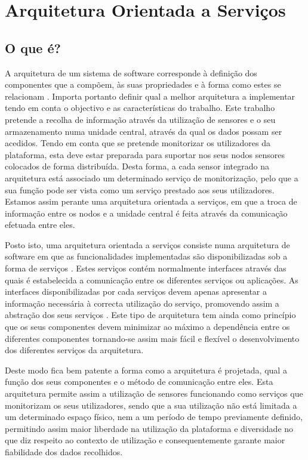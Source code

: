 \chapter{Arquitetura Orientada a Serviços}

\section{O que é?}
A arquitetura de um sistema de software corresponde à definição dos componentes que a compõem, às suas propriedades e à forma como estes se relacionam \cite{bosch2004software}. Importa portanto definir qual a melhor arquitetura a implementar tendo em conta o objectivo e as características do trabalho. Este trabalho pretende a recolha de informação através da utilização de sensores e o seu armazenamento numa unidade central, através da qual os dados possam ser acedidos. Tendo em conta que se pretende monitorizar os utilizadores da plataforma, esta deve estar preparada para suportar nos seus nodos sensores colocados de forma distribuída. Desta forma, a cada sensor integrado na arquitetura está associado um determinado serviço de monitorização, pelo que a sua função pode ser vista como um serviço prestado aos seus utilizadores. Estamos assim perante uma arquitetura orientada a serviços, em que a troca de informação entre os nodos e a unidade central é feita através da comunicação efetuada entre eles.

Posto isto, uma arquitetura orientada a serviços consiste numa arquitetura de software em que as funcionalidades implementadas são disponibilizadas sob a forma de serviços \cite{he2003service, papazoglou2003service}. Estes serviços contém normalmente interfaces através das quais é estabelecida a comunicação entre os diferentes serviços ou aplicações. As interfaces disponibilizadas por cada serviços devem apenas apresentar a informação necessária à correcta utilização do serviço, promovendo assim a abstração dos seus serviços \cite{erl2004service, krafzig2005enterprise}. Este tipo de arquitetura tem ainda como princípio que os seus componentes devem minimizar ao máximo a dependência entre os diferentes componentes \cite{erl2004service, krafzig2005enterprise} tornando-se assim mais fácil e flexível o desenvolvimento dos diferentes serviços da arquitetura.

Deste modo fica bem patente a forma como a arquitetura é projetada, qual a função dos seus componentes e o método de comunicação entre eles. Esta arquitetura permite assim a utilização de sensores funcionando como serviços que monitorizam os seus utilizadores, sendo que a sua utilização não está limitada a um determinado espaço físico, nem a um período de tempo previamente definido, permitindo assim maior liberdade na utilização da plataforma e diversidade no que diz respeito ao contexto de utilização e consequentemente garante maior fiabilidade dos dados recolhidos.


